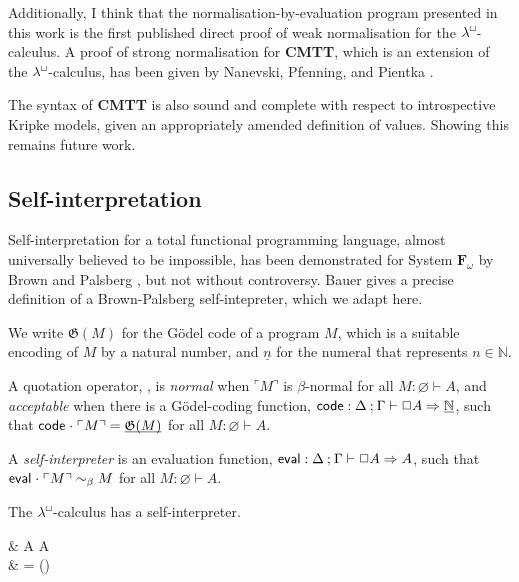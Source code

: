 \documentclass{entcs}
\newcommand{\lambdabox}{\lambda^{\mkern-1mu\sq\mkern-2mu}}
\renewcommand{\:}{\mathrel{:}}
\newcommand{\padcolon}{\mathrel{\rlap{$\mkern4.5mu:$}\hphantom{=}}}
\renewcommand{\;}{\mathbin{;}}
\newcommand{\tsf}[1]{\textsf{\upshape{#1}}}
\newcommand{\stsf}[1]{\tsf{\small{#1}}}
\newcommand{\tyrule}[1]{\prftree[l]{${#1} \:\,$}}
\newcommand{\R}{\Rightarrow}
\newcommand{\sq}{\Box}
\renewcommand{\O}{\varnothing}
\renewcommand{\e}{\mathrel{\vdash}}
\newcommand{\lam}{\operatorname{\underline{\lambda}}}
\newcommand{\app}{\mathrel{\cdot}}
\newcommand{\quo}[1]{\mathord{\ulcorner}{#1}\mathord{\urcorner}}
\newcommand{\unquo}[2]{\mathord{\llcorner}{#1}\mathord{\lrcorner}{#2}}
\newcommand{\mvO}{\operatorname{^{\stsf{mv}\mkern-1mu}\tsf{0}}}
\newcommand{\vO}{\operatorname{^{\stsf{v}\mkern-1mu}\tsf{0}}}
\newcommand{\bconv}{\mathrel{\sim_{\beta}}}
\newcommand{\code}{\operatorname{\tsf{code}}}
\newcommand{\eval}{\operatorname{\tsf{eval}}}
\begin{document}
Additionally, I think that the normalisation-by-evaluation program presented in this work is the first published direct proof of weak normalisation for the $\lambdabox$-calculus.  A proof of strong normalisation for \textbf{CMTT}, which is an extension of the $\lambdabox$-calculus, has been given by Nanevski, Pfenning, and Pientka \cite{NanevskiPP08}.

The syntax of \textbf{CMTT} is also sound and complete with respect to introspective Kripke models, given an appropriately amended definition of values.  Showing this remains future work.




\subsection*{Self-interpretation}

Self-interpretation for a total functional programming language, almost universally believed to be impossible, has been demonstrated for System $\textbf{F}_{\omega}$ by Brown and Palsberg \cite{BrownP16}, but not without controversy.  Bauer \cite{Bauer16} gives a precise definition of a Brown-Palsberg self-intepreter, which we adapt here.

We write $\mathfrak{G}(M)$ for the G\"{o}del code of a program $M$, which is a suitable encoding of $M$ by a natural number, and $\underline{n}$ for the numeral that represents $n \in \mathbb{N}$.

\begin{definition}\label{normality}
  A quotation operator, \tyrule{\quo{-}}{\O \e A}{\Delta \; \Gamma \e \sq A}, is \emph{normal} when $\quo{M}$ is $\beta$-normal for all $M \: \O \e A$, and \emph{acceptable} when there is a G\"{o}del-coding function, $\code \: \Delta \; \Gamma \e \sq A \R \underline{\mathbb{N}}$, such that $\code \app \quo{M} = \underline{\smash{\mathfrak{G}(M)}}$ for all $M \: \O \e A$.
\end{definition}

\begin{definition}
  A \emph{self-interpreter} is an evaluation function, $\eval \: \Delta \; \Gamma \e \sq A \R A$, such that $\eval \app \quo{M} \bconv M$ for all $M \: \O \e A$.
\end{definition}

\begin{theorem}
  The $\lambdabox$-calculus has a self-interpreter.
  \begin{proofalign*}
    & \eval \padcolon \Delta \; \Gamma \e \sq A \R A\\
    & \eval = \lam (\unquo{\vO}{\mvO})
  \end{proofalign*}
\end{theorem}
\end{document}
